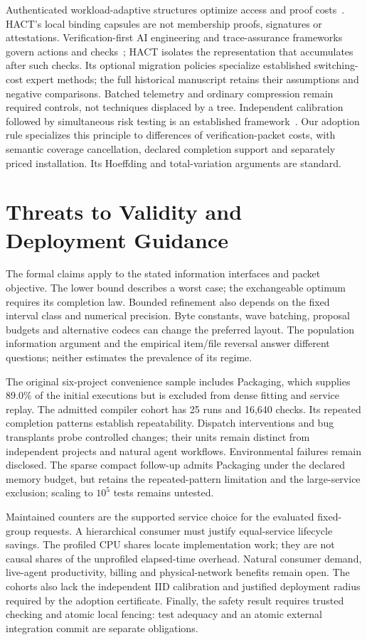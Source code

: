 \documentclass[10pt,journal,compsoc]{IEEEtran}
\theoremstyle{definition}\newtheorem{definition}[theorem]{Definition}
\begin{document}
Authenticated workload-adaptive structures optimize access and proof
costs~\cite{hmt}. HACT's local binding capsules are not membership proofs,
signatures or attestations. Verification-first AI engineering and
trace-assurance frameworks govern actions and checks~\cite{aiware,traceassurance};
HACT isolates the representation that accumulates after such checks.
Its optional migration policies specialize established switching-cost expert
methods; the full historical manuscript retains their assumptions and
negative comparisons. Batched telemetry and ordinary compression remain
required controls, not techniques displaced by a tree.
Independent calibration followed by simultaneous risk testing is an
established framework~\cite{learntest}. Our adoption rule specializes this
principle to differences of verification-packet costs, with semantic
coverage cancellation, declared completion support and separately priced
installation. Its Hoeffding and total-variation arguments are standard.

\section{Threats to Validity and Deployment Guidance}
The formal claims apply to the stated information interfaces and packet
objective. The lower bound describes a worst case; the exchangeable optimum
requires its completion law. Bounded refinement also depends on the fixed
interval class and numerical precision. Byte constants, wave batching,
proposal budgets and alternative codecs can change the preferred layout.
The population information argument and the empirical item/file reversal
answer different questions; neither estimates the prevalence of its regime.

The original six-project convenience sample includes Packaging, which supplies
89.0\% of the initial executions but is excluded from dense fitting and service
replay. The admitted compiler cohort has 25 runs and 16,640 checks. Its repeated
completion patterns establish repeatability. Dispatch interventions and bug
transplants probe controlled changes; their units remain distinct from
independent projects and natural agent workflows. Environmental failures
remain disclosed. The sparse compact follow-up admits Packaging under the
declared memory budget, but retains the repeated-pattern limitation and the
large-service exclusion; scaling to $10^5$ tests remains untested.

Maintained counters are the supported service choice for the evaluated
fixed-group requests. A hierarchical consumer must justify equal-service
lifecycle savings. The profiled CPU shares locate implementation work;
they are not causal shares of the unprofiled elapsed-time overhead. Natural
consumer demand, live-agent productivity, billing and physical-network
benefits remain open. The cohorts also lack the independent IID calibration
and justified deployment radius required by the adoption certificate.
Finally, the safety result requires trusted checking and atomic local
fencing: test adequacy and an atomic external integration commit are
separate obligations.
\end{document}
